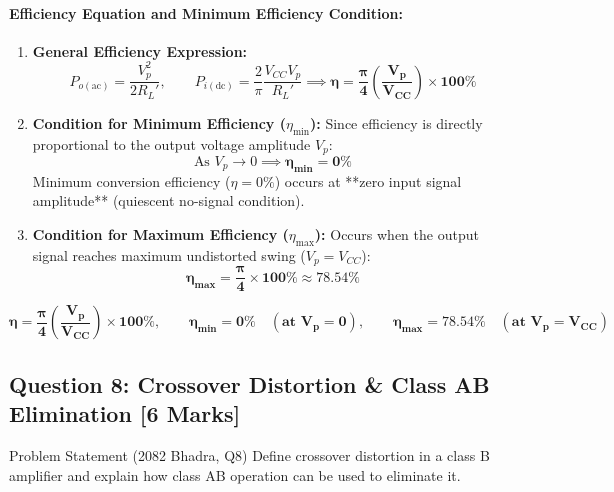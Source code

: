 \documentclass[11pt,a4paper,oneside]{book}
\begin{document}
\paragraph{Efficiency Equation and Minimum Efficiency Condition:}
\begin{enumerate}[leftmargin=1.5em]
  \item \textbf{General Efficiency Expression:}
  \[
  P_{o(\text{ac})} = \frac{V_p^2}{2 R_L'}, \qquad P_{i(\text{dc})} = \frac{2}{\pi} \frac{V_{CC} V_p}{R_L'} \implies \mathbf{\eta = \frac{\pi}{4} \left(\frac{V_p}{V_{CC}}\right) \times 100\%}
  \]
  \item \textbf{Condition for Minimum Efficiency ($\eta_{\min}$):}
  Since efficiency is directly proportional to the output voltage amplitude $V_p$:
  \[
  \text{As } V_p \to 0 \implies \mathbf{\eta_{\min} = 0\%}
  \]
  Minimum conversion efficiency ($\eta = 0\%$) occurs at **zero input signal amplitude** (quiescent no-signal condition).
  \item \textbf{Condition for Maximum Efficiency ($\eta_{\max}$):}
  Occurs when the output signal reaches maximum undistorted swing ($V_p = V_{CC}$):
  \[
  \mathbf{\eta_{\max} = \frac{\pi}{4} \times 100\% \approx 78.54\%}
  \]
\end{enumerate}

\begin{answerbox}
$$\mathbf{\eta = \frac{\pi}{4} \left(\frac{V_p}{V_{CC}}\right) \times 100\%, \qquad \eta_{\min} = 0\% \quad (\text{at } V_p = 0), \qquad \eta_{\max} = 78.54\% \quad (\text{at } V_p = V_{CC})}$$
\end{answerbox}

\vspace{0.6cm}

\subsection{Question 8: Crossover Distortion \& Class AB Elimination [6 Marks]}
\begin{questionbox}{Problem Statement (2082 Bhadra, Q8)}
Define crossover distortion in a class B amplifier and explain how class AB operation can be used to eliminate it.
\end{questionbox}
\end{document}
